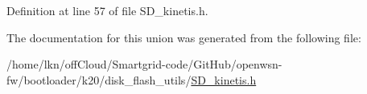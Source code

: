 Definition at line 57 of file S\+D\+\_\+kinetis.\+h.



The documentation for this union was generated from the following file\+:\begin{DoxyCompactItemize}
\item 
/home/lkn/off\+Cloud/\+Smartgrid-\/code/\+Git\+Hub/openwsn-\/fw/bootloader/k20/disk\+\_\+flash\+\_\+utils/\hyperlink{_s_d__kinetis_8h}{S\+D\+\_\+kinetis.\+h}\end{DoxyCompactItemize}
